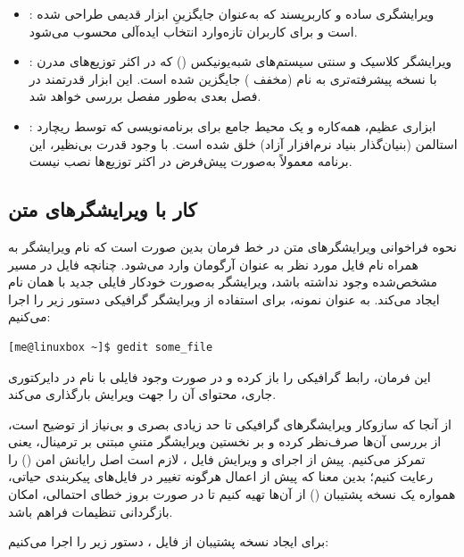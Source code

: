 \begin{itemize}
  \item {}: ویرایشگری ساده و کاربرپسند که به‌عنوان جایگزینِ ابزار قدیمی  طراحی شده است و برای کاربران تازه‌وارد انتخاب ایده‌آلی محسوب می‌شود.
  \item {}: ویرایشگر کلاسیک و سنتی سیستم‌های شبه‌یونیکس () که در اکثر توزیع‌های مدرن با نسخه پیشرفته‌تری به نام  (مخفف ) جایگزین شده است. این ابزار قدرتمند در فصل بعدی به‌طور مفصل بررسی خواهد شد.
  \item {}: ابزاری عظیم، همه‌کاره و یک محیط جامع برای برنامه‌نویسی که توسط ریچارد استالمن (بنیان‌گذار بنیاد نرم‌افزار آزاد) خلق شده است. با وجود قدرت بی‌نظیر، این برنامه معمولاً به‌صورت پیش‌فرض در اکثر توزیع‌ها نصب نیست.
\end{itemize}

\subsection{کار با ویرایشگرهای متن}

نحوه فراخوانی ویرایشگرهای متن در خط فرمان بدین صورت است که نام ویرایشگر به همراه نام فایل مورد نظر به عنوان آرگومان وارد می‌شود. چنانچه فایل در مسیر مشخص‌شده وجود نداشته باشد، ویرایشگر به‌صورت خودکار فایلی جدید با همان نام ایجاد می‌کند. به عنوان نمونه، برای استفاده از ویرایشگر گرافیکی  دستور زیر را اجرا می‌کنیم:

\begin{latin}
\begin{lstlisting}
[me@linuxbox ~]$ gedit some_file
\end{lstlisting}
\end{latin}

این فرمان، رابط گرافیکی  را باز کرده و در صورت وجود فایلی با نام  در دایرکتوری جاری، محتوای آن را جهت ویرایش بارگذاری می‌کند.

از آنجا که سازوکار ویرایشگرهای گرافیکی تا حد زیادی بصری و بی‌نیاز از توضیح است، از بررسی آن‌ها صرف‌نظر کرده و بر نخستین ویرایشگر متنیِ مبتنی بر ترمینال، یعنی  تمرکز می‌کنیم. پیش از اجرای  و ویرایش فایل ، لازم است اصل رایانش امن () را رعایت کنیم؛ بدین معنا که پیش از اعمال هرگونه تغییر در فایل‌های پیکربندی حیاتی، همواره یک نسخه پشتیبان () از آن‌ها تهیه کنیم تا در صورت بروز خطای احتمالی، امکان بازگردانی تنظیمات فراهم باشد.

برای ایجاد نسخه پشتیبان از فایل ، دستور زیر را اجرا می‌کنیم:

